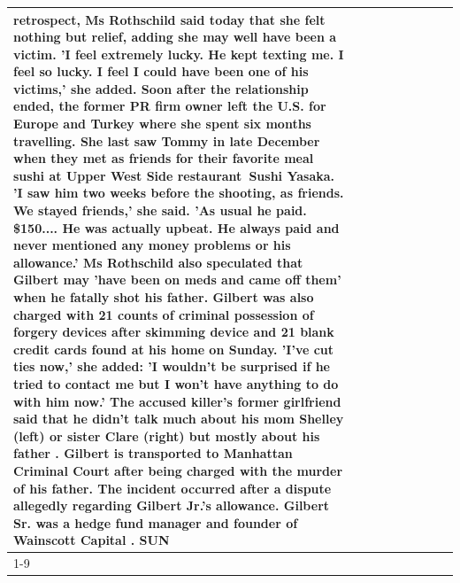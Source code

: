 \begin{table}[H]
\begin{tabular}{lllrlllll}
retrospect, Ms Rothschild said today that she felt nothing but relief, adding she may well have been a victim. 'I feel extremely lucky. He kept texting me. I feel so lucky. I feel I could have been one of his victims,' she added. Soon after the relationship ended, the former PR firm owner left the U.S. for Europe and Turkey where she spent six months  travelling. She last saw Tommy in late December when they met as friends for their favorite meal sushi at Upper West Side restaurant Sushi Yasaka. 'I saw him two weeks before the shooting, as friends. We stayed friends,' she said. 'As usual he paid. \$150.... He was actually upbeat. He always paid and never mentioned any money problems or his allowance.' Ms Rothschild also speculated that Gilbert may 'have been on meds and came off them' when he fatally shot his father. Gilbert was also charged with 21 counts of criminal possession of forgery devices after skimming device and 21 blank credit cards found at his home on Sunday. 'I've cut ties now,' she added: 'I wouldn’t be surprised if he tried to contact me but I won’t have anything to do with him now.' The accused killer's former girlfriend said that he didn't talk much about his mom Shelley (left) or sister Clare (right) but mostly about his father . Gilbert is transported to Manhattan Criminal Court  after being charged with the murder of his father. The incident occurred after a dispute allegedly regarding Gilbert Jr.'s allowance. Gilbert Sr. was a hedge fund manager and founder of Wainscott Capital . SUN \\
\cline{1-9}

\end{tabular}
\end{table}
